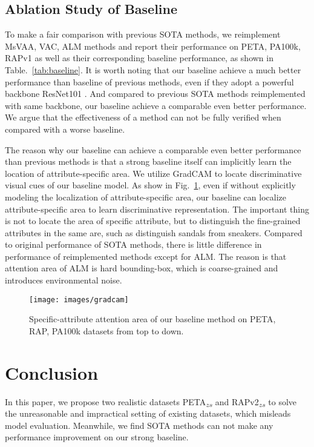 \documentclass[runningheads]{llncs}
\begin{document}
\subsection{Ablation Study of Baseline}
To make a fair comparison with previous SOTA methods, we reimplement MsVAA, VAC, ALM methods and report their performance on PETA, PA100k, RAPv1 as well as their corresponding baseline performance, as shown in Table.~\ref{tab:baseline}. It is worth noting that our baseline achieve a much better performance than baseline of previous methods, even if they adopt a powerful backbone ResNet101 \cite{he2016deep}. And compared to previous SOTA methods reimplemented with same backbone, our baseline achieve a comparable even better performance. We argue that the effectiveness of a method can not be fully verified when compared with a worse baseline. 

The reason why our baseline can achieve a comparable even better performance than previous methods is that a strong baseline itself can implicitly learn the location of attribute-specific area. We utilize GradCAM \cite{selvaraju2017grad} to locate discriminative visual cues of our baseline model. As show in Fig.~\ref{fig:attention}, even if without explicitly modeling the localization of attribute-specific area, our baseline can localize attribute-specific area to learn discriminative representation. The important thing is not to locate the area of specific attribute, but to distinguish the fine-grained attributes in the same are, such as  distinguish sandals from sneakers. Compared to original performance of SOTA methods, there is little difference in performance of reimplemented methods except for ALM. The reason is that attention area of ALM is hard bounding-box, which is coarse-grained and introduces environmental noise.

\begin{figure}
\vspace{-1em}
\centering
\texttt{[image: images/gradcam]}
\caption{Specific-attribute attention area of our baseline method on PETA, RAP, PA100k datasets from top to down.}
\label{fig:attention}
\vspace{-1em}
\end{figure}



\section{Conclusion} \label{conclusion}
In this paper, we propose two realistic datasets PETA\textsubscript{$zs$} and RAPv2\textsubscript{$zs$} to solve the unreasonable and impractical setting of existing datasets, which misleads model evaluation. Meanwhile, we find SOTA methods can not make any performance improvement on our strong baseline.

\clearpage


\end{document}
